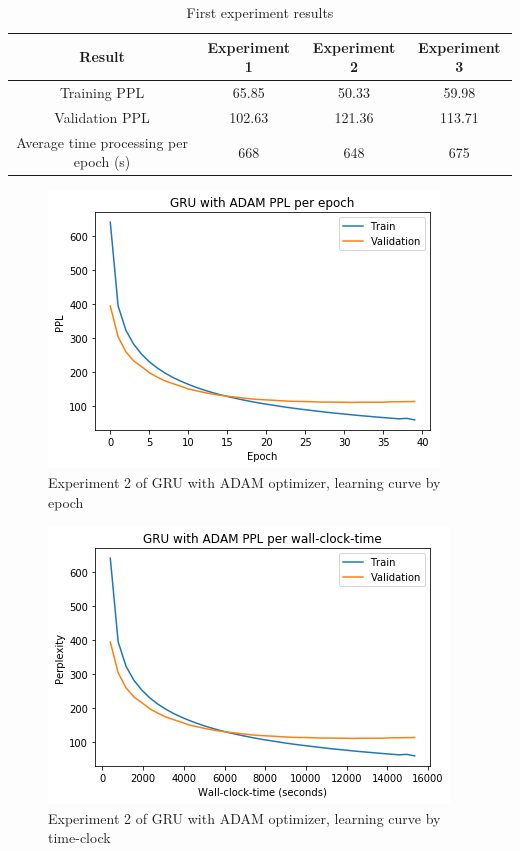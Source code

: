 \begin{itemize}
	\begin{table}[H]
		\centering
		\begin{tabular}{||c c c c||} 
			\hline
			\textbf{Result} & \textbf{Experiment 1} & \textbf{Experiment 2}& \textbf{Experiment 3} \\[0.5ex] 
			\hline
			Training PPL & 65.85& 50.33& 59.98 \\
			Validation PPL & 102.63 & 121.36 & 113.71  \\
			Average time processing per epoch (s) & 668 & 648 & 675 \\[1ex]
			\hline
		\end{tabular}
		\caption{First experiment results}
		\label{table:4.1}
	\end{table}

\begin{figure}[H]
	\centering
	\includegraphics[scale=0.8]{Q4-2_GRU_ADAM_epoch.png}
	\caption{Experiment 2 of GRU with ADAM optimizer, learning curve by epoch}
	\label{fig:fig11}
\end{figure}

\begin{figure}[H]
	\centering
	\includegraphics[scale=0.8]{Q4-2_GRU_ADAM_clock.png}
	\caption{Experiment 2 of GRU with ADAM optimizer, learning curve by time-clock}
	\label{fig:fig12}
\end{figure}


\end{itemize}
